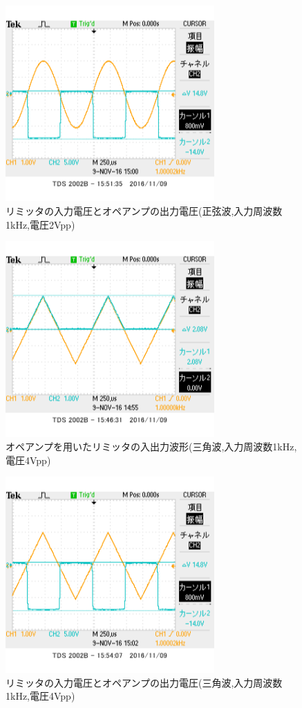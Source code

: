 \documentclass[11pt,a4j]{jsarticle}
\begin{document}
 \begin{figure}[htbp]
  \centering
  \includegraphics[width=8cm,clip]{1_1_ampFG_f1V2_ViVa.png}
  \caption{リミッタの入力電圧とオペアンプの出力電圧(正弦波,入力周波数1kHz,電圧2Vpp)}
  \label{fig:ampFGf1v2viva}
 \end{figure}%
 
 \begin{figure}[htbp]
  \centering
  \includegraphics[width=8cm,clip]{1_1_ampFG_f1V4sankaku_ViVo.png}
  \caption{オペアンプを用いたリミッタの入出力波形(三角波,入力周波数1kHz,電圧4Vpp)}
  \label{fig:ampFGf1v4vivo}
 \end{figure}%
 
 \begin{figure}[htbp]
  \centering
  \includegraphics[width=8cm,clip]{1_1_ampFG_f1V4sankaku_ViVa.png}
  \caption{リミッタの入力電圧とオペアンプの出力電圧(三角波,入力周波数1kHz,電圧4Vpp)}
  \label{fig:ampFGf1v4viva}
 \end{figure}%
 
\end{document}
